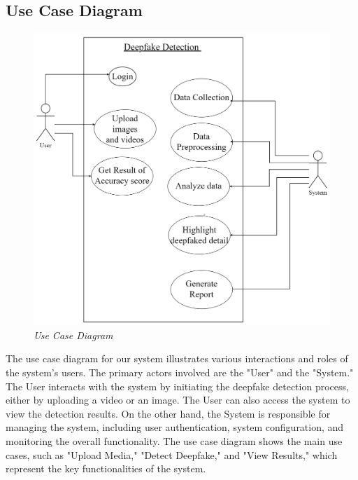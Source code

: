 
\subsection{Use Case Diagram}
\begin{figure}[h]
    \centering
    \includegraphics[width= 5in ]{img/usecasediagram.drawio.png}
    \caption{\textit{Use Case Diagram}}
\end{figure}
\justify
The use case diagram for our system illustrates various interactions and roles of the system's users. The primary actors involved are the "User" and the "System." The User interacts with the system by initiating the deepfake detection process, either by uploading a video or an image. The User can also access the system to view the detection results. On the other hand, the System is responsible for managing the system, including user authentication, system configuration, and monitoring the overall functionality. The use case diagram shows the main use cases, such as "Upload Media," "Detect Deepfake," and "View Results," which represent the key functionalities of the system.